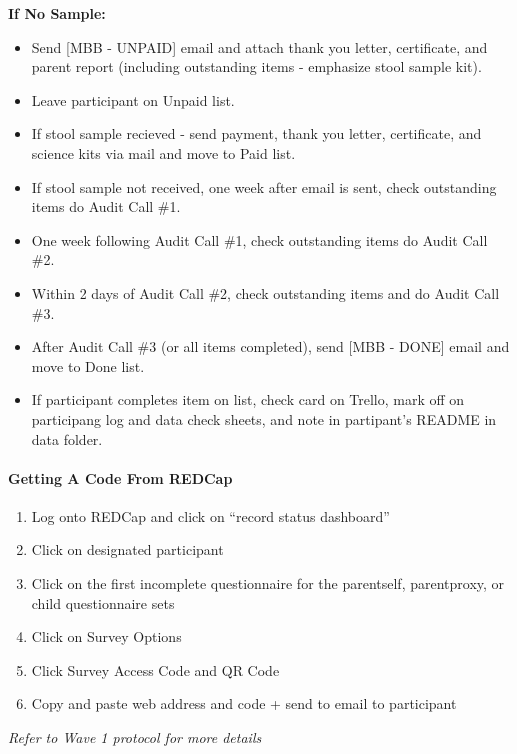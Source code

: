 \documentclass[]{book}
\let\oldparagraph\paragraph
\renewcommand{\paragraph}[1]{\oldparagraph{#1}\mbox{}}
\begin{document}
\textbf{If No Sample:}

\begin{itemize}
\item
  Send {[}MBB - UNPAID{]} email and attach thank you letter, certificate, and parent report (including outstanding items - emphasize stool sample kit).
\item
  Leave participant on Unpaid list.
\item
  If stool sample recieved - send payment, thank you letter, certificate, and science kits via mail and move to Paid list.
\item
  If stool sample not received, one week after email is sent, check outstanding items do Audit Call \#1.
\item
  One week following Audit Call \#1, check outstanding items do Audit Call \#2.
\item
  Within 2 days of Audit Call \#2, check outstanding items and do Audit Call \#3.
\item
  After Audit Call \#3 (or all items completed), send {[}MBB - DONE{]} email and move to Done list.
\item
  If participant completes item on list, check card on Trello, mark off on participang log and data check sheets, and note in partipant's README in data folder.
\end{itemize}

\hypertarget{getting-a-code-from-redcap-1}{%
\paragraph{Getting A Code From REDCap}\label{getting-a-code-from-redcap-1}}

\begin{enumerate}
\def\labelenumi{\arabic{enumi}.}
\item
  Log onto REDCap and click on ``record status dashboard''
\item
  Click on designated participant
\item
  Click on the first incomplete questionnaire for the parentself, parentproxy, or child questionnaire sets
\item
  Click on Survey Options
\item
  Click Survey Access Code and QR Code
\item
  Copy and paste web address and code + send to email to participant
\end{enumerate}

\emph{Refer to Wave 1 protocol for more details}
\end{document}
